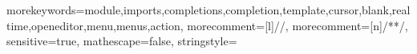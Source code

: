  {
	morekeywords={module,imports,completions,completion,template,cursor,blank,realtime,openeditor,menu,menus,action},
	morecomment=[l]{//},
	morecomment=[n]{/*}{*/},
  sensitive=true,
  mathescape=false,
  stringstyle=\color{green}
}

\newcommand{\esvcode}[1]{\lstinline[language=TS,basicstyle=\lstinlinestyle,breaklines=false]{#1}}
\newcommand{\esvcodebl}[1]{\lstinline[language=TS,basicstyle=\lstinlinestyle,breaklines=true]{#1}}
\newcommand{\ESV}{\langname{ESV}}
